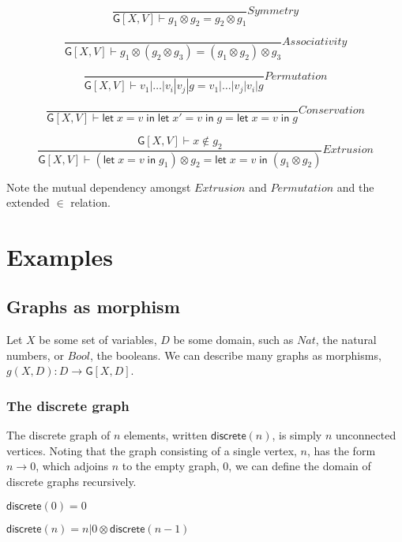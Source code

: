 \documentclass[12pt]{llncs}
\begin{document}
\[\frac{ }{ \mathsf{G}[X,V] \vdash g_1 \otimes g_2 = g_2 \otimes g_1}Symmetry\]

\[\frac{ }{ \mathsf{G}[X,V] \vdash g_1 \otimes ( g_2 \otimes g_3 ) = ( g_1 \otimes g_2) \otimes g_3}Associativity\]

\[\frac{ }{ \mathsf{G}[X,V] \vdash v_1|\ldots|v_i|v_j|g = v_1|\ldots|v_j|v_i|g}Permutation\]

\[\frac{ }{ \mathsf{G}[X,V] \vdash \mathsf{let}\; x = v \; \mathsf{in}\; \mathsf{let}\; x' = v \; \mathsf{in}\; g = \mathsf{let}\; x = v \; \mathsf{in}\; g}Conservation\]

\[\frac{ \mathsf{G}[X,V] \vdash x \notin g_2}{ \mathsf{G}[X,V] \vdash (\mathsf{let}\; x = v \; \mathsf{in}\; g_1) \otimes g_2 = \mathsf{let}\; x = v \; \mathsf{in}\; ( g_1 \otimes g_2)}Extrusion\]

Note the mutual dependency amongst \(Extrusion\) and \(Permutation\) and
the extended \(\in\) relation.

\hypertarget{examples}{%
\section{Examples}\label{examples}}

\hypertarget{graphs-as-morphism}{%
\subsection{Graphs as morphism}\label{graphs-as-morphism}}

Let \(X\) be some set of variables, \(D\) be some domain, such as
\(Nat\), the natural numbers, or \(Bool\), the booleans. We can describe
many graphs as morphisms, \(g(X,D): D \to \mathsf{G}[X,D]\).

\hypertarget{the-discrete-graph}{%
\subsubsection{The discrete graph}\label{the-discrete-graph}}

The discrete graph of \(n\) elements, written \(\mathsf{discrete}(n)\),
is simply \(n\) unconnected vertices. Noting that the graph consisting
of a single vertex, \(n\), has the form \(n \to 0\), which adjoins \(n\)
to the empty graph, \(0\), we can define the domain of discrete graphs
recursively.

\(\mathsf{discrete}(0) = 0\)

\(\mathsf{discrete}(n) = n | 0 \otimes \mathsf{discrete}(n-1)\)
\end{document}
